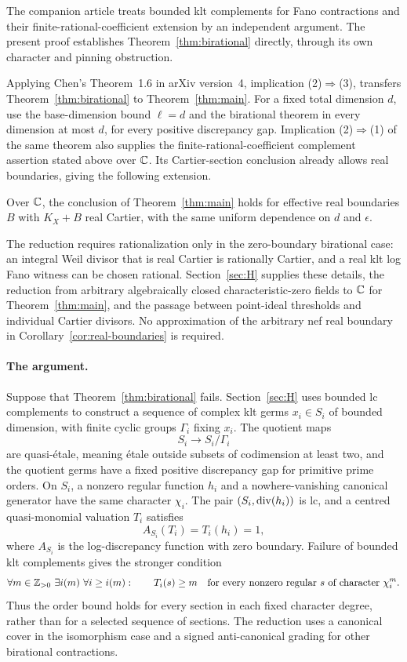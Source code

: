 The companion article \cite[Theorem~1.1 and Corollary~1.2]{OpenAIComplements}
treats bounded klt complements for Fano contractions and their
finite-rational-coefficient extension by an independent argument.
The present proof establishes Theorem~\ref{thm:birational} directly,
through its own character and pinning obstruction.

Applying Chen's Theorem~1.6 in arXiv version~4, implication (2)$\Rightarrow$(3), transfers Theorem~\ref{thm:birational} to Theorem~\ref{thm:main}. For a fixed total dimension $d$, use the base-dimension bound $\ell=d$ and the birational theorem in every dimension at most $d$, for every positive discrepancy gap. Implication (2)$\Rightarrow$(1) of the same theorem also supplies the finite-rational-coefficient complement assertion stated above over $\mathbb C$. Its Cartier-section conclusion already allows real boundaries, giving the following extension.

\begin{maincorollary}\label{cor:real-boundaries}
Over $\mathbb C$, the conclusion of Theorem~\ref{thm:main} holds for effective real boundaries $B$ with $K_X+B$ real Cartier, with the same uniform dependence on $d$ and $\epsilon$.
\end{maincorollary}

The reduction requires rationalization only in the zero-boundary birational case: an integral Weil divisor that is real Cartier is rationally Cartier, and a real klt log Fano witness can be chosen rational. Section~\ref{sec:H} supplies these details, the reduction from arbitrary algebraically closed characteristic-zero fields to $\mathbb C$ for Theorem~\ref{thm:main}, and the passage between point-ideal thresholds and individual Cartier divisors. No approximation of the arbitrary nef real boundary in Corollary~\ref{cor:real-boundaries} is required.

\paragraph{The argument.}
Suppose that Theorem~\ref{thm:birational} fails. Section~\ref{sec:H} uses bounded lc complements to construct a sequence of complex klt germs $x_i\in S_i$ of bounded dimension, with finite cyclic groups $\Gamma_i$ fixing $x_i$. The quotient maps
\[
 S_i\longrightarrow S_i/\Gamma_i
\]
are quasi-\'etale, meaning \'etale outside subsets of codimension at least two, and the quotient germs have a fixed positive discrepancy gap for primitive prime orders. On $S_i$, a nonzero regular function $h_i$ and a nowhere-vanishing canonical generator have the same character $\chi_i$. The pair $(S_i,\operatorname{div}(h_i))$ is lc, and a centred quasi-monomial valuation $T_i$ satisfies
\[
 A_{S_i}(T_i)=T_i(h_i)=1,
\]
where $A_{S_i}$ is the log-discrepancy function with zero boundary. Failure of bounded klt complements gives the stronger condition
\[
 \forall m\in\mathbb Z_{>0}\ \exists i(m)\ \forall i\ge i(m):\qquad
 T_i(s)\ge m
 \quad\text{for every nonzero regular $s$ of character $\chi_i^m$.}
\]
Thus the order bound holds for every section in each fixed character degree, rather than for a selected sequence of sections. The reduction uses a canonical cover in the isomorphism case and a signed anti-canonical grading for other birational contractions.

